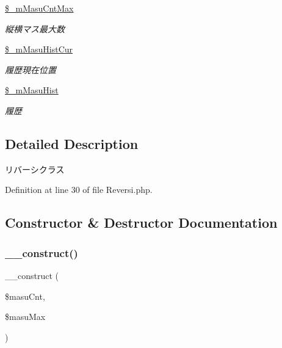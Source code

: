\begin{DoxyCompactItemize}
\mbox{\label{class_reversi_ae40f5163a8835d2ee564386a09ce196a}} 
\hyperlink{class_reversi_ae40f5163a8835d2ee564386a09ce196a}{\$\+\_\+m\+Masu\+Cnt\+Max}
\begin{DoxyCompactList}\small\item\em 縦横マス最大数 \end{DoxyCompactList}\item 
\mbox{\label{class_reversi_af77c253cf42f9796e0bdc729e6d0c087}} 
\hyperlink{class_reversi_af77c253cf42f9796e0bdc729e6d0c087}{\$\+\_\+m\+Masu\+Hist\+Cur}
\begin{DoxyCompactList}\small\item\em 履歴現在位置 \end{DoxyCompactList}\item 
\mbox{\label{class_reversi_ad5e2d002bf79a6295aea9513cb11f2e3}} 
\hyperlink{class_reversi_ad5e2d002bf79a6295aea9513cb11f2e3}{\$\+\_\+m\+Masu\+Hist}
\begin{DoxyCompactList}\small\item\em 履歴 \end{DoxyCompactList}\end{DoxyCompactItemize}


\subsection{Detailed Description}
リバーシクラス 

Definition at line 30 of file Reversi.\+php.



\subsection{Constructor \& Destructor Documentation}
\mbox{\label{class_reversi_a6667ca490c75777ec233f3ead04c5fd7}} 
\subsubsection{\texorpdfstring{\+\_\+\+\_\+construct()}{\_\_construct()}}
{\footnotesize\ttfamily \+\_\+\+\_\+construct (\begin{DoxyParamCaption}\item[{}]{\$masu\+Cnt,  }\item[{}]{\$masu\+Max }\end{DoxyParamCaption})}



